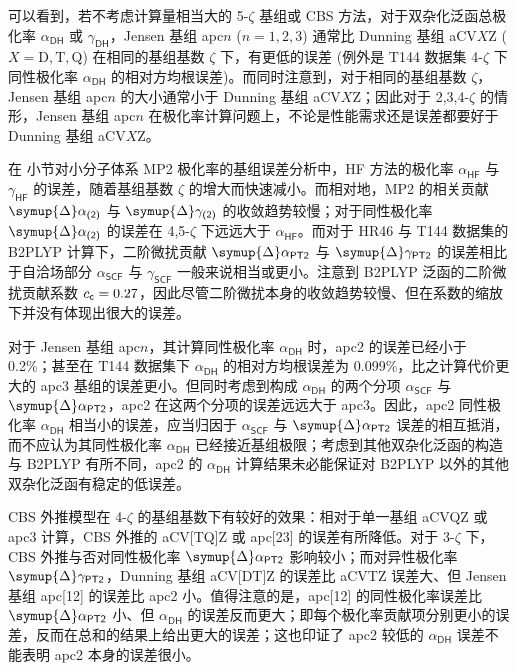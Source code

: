 可以看到，若不考虑计算量相当大的 5-$\zeta$ 基组或 CBS 方法，对于双杂化泛函总极化率 $\alpha_\textsf{DH}$ 或 $\gamma_\textsf{DH}$，Jensen 基组 apc$n$ ($n = 1, 2, 3$) 通常比 Dunning 基组 aCV$X$Z ($X = \mathrm{D, T, Q}$) 在相同的基组基数 $\zeta$ 下，有更低的误差 (例外是 T144 数据集 4-$\zeta$ 下同性极化率 $\alpha_\textsf{DH}$ 的相对方均根误差)。而同时注意到，对于相同的基组基数 $\zeta$，Jensen 基组 apc$n$ 的大小通常小于 Dunning 基组 aCV$X$Z；因此对于 2,3,4-$\zeta$ 的情形，Jensen 基组 apc$n$ 在极化率计算问题上，不论是性能需求还是误差都要好于 Dunning 基组 aCV$X$Z。

在  小节对小分子体系 MP2 极化率的基组误差分析中，HF 方法的极化率 $\alpha_\textsf{HF}$ 与 $\gamma_\textsf{HF}$ 的误差，随着基组基数 $\zeta$ 的增大而快速减小。而相对地，MP2 的相关贡献 $\symup{\Delta} \alpha_\textsf{(2)}$ 与 $\symup{\Delta} \gamma_\textsf{(2)}$ 的收敛趋势较慢；对于同性极化率 $\symup{\Delta} \alpha_\textsf{(2)}$ 的误差在 4,5-$\zeta$ 下远远大于 $\alpha_\textsf{HF}$。而对于 HR46 与 T144 数据集的 B2PLYP 计算下，二阶微扰贡献 $\symup{\Delta} \alpha_\textsf{PT2}$ 与 $\symup{\Delta} \gamma_\textsf{PT2}$ 的误差相比于自洽场部分 $\alpha_\textsf{SCF}$ 与 $\gamma_\textsf{SCF}$ 一般来说相当或更小。注意到 B2PLYP 泛函的二阶微扰贡献系数 $c_{\textsf{c}} = 0.27$，因此尽管二阶微扰本身的收敛趋势较慢、但在系数的缩放下并没有体现出很大的误差。

对于 Jensen 基组 apc$n$，其计算同性极化率 $\alpha_\textsf{DH}$ 时，apc2 的误差已经小于 0.2\%；甚至在 T144 数据集下 $\alpha_\textsf{DH}$ 的相对方均根误差为 0.099\%，比之计算代价更大的 apc3 基组的误差更小。但同时考虑到构成 $\alpha_\textsf{DH}$ 的两个分项 $\alpha_\textsf{SCF}$ 与 $\symup{\Delta} \alpha_\textsf{PT2}$，apc2 在这两个分项的误差远远大于 apc3。因此，apc2 同性极化率 $\alpha_\textsf{DH}$ 相当小的误差，应当归因于 $\alpha_\textsf{SCF}$ 与 $\symup{\Delta} \alpha_\textsf{PT2}$ 误差的相互抵消，而不应认为其同性极化率 $\alpha_\textsf{DH}$ 已经接近基组极限；考虑到其他双杂化泛函的构造与 B2PLYP 有所不同，apc2 的 $\alpha_\textsf{DH}$ 计算结果未必能保证对 B2PLYP 以外的其他双杂化泛函有稳定的低误差。

CBS 外推模型在 4-$\zeta$ 的基组基数下有较好的效果：相对于单一基组 aCVQZ 或 apc3 计算，CBS 外推的 aCV[TQ]Z 或 apc[23] 的误差有所降低。对于 3-$\zeta$ 下，CBS 外推与否对同性极化率 $\symup{\Delta} \alpha_\textsf{PT2}$ 影响较小；而对异性极化率 $\symup{\Delta} \gamma_\textsf{PT2}$，Dunning 基组 aCV[DT]Z 的误差比 aCVTZ 误差大、但 Jensen 基组 apc[12] 的误差比 apc2 小。值得注意的是，apc[12] 的同性极化率误差比 $\symup{\Delta} \alpha_\textsf{PT2}$ 小、但 $\alpha_\textsf{DH}$ 的误差反而更大；即每个极化率贡献项分别更小的误差，反而在总和的结果上给出更大的误差；这也印证了 apc2 较低的 $\alpha_\textsf{DH}$ 误差不能表明 apc2 本身的误差很小。

